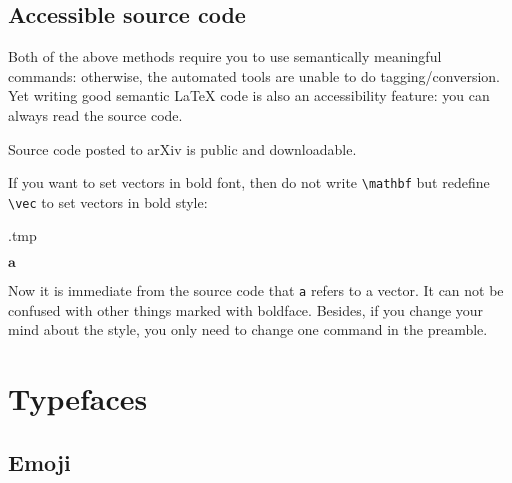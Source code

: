 %
%
\subsection{Accessible source code}

Both of the above methods require you to use semantically meaningful commands:
otherwise, the automated tools are unable to do tagging/conversion.
Yet writing good semantic \LaTeX{} code is also an accessibility feature:
you can always read the source code.

\begin{remark}
Source code posted to arXiv is public and downloadable.
\end{remark}

If you want to set vectors in bold font, then do not write \verb|\mathbf| but
redefine \verb|\vec| to set vectors in bold style:
%
\begin{VerbatimOut}{\jobname.tmp}
\renewcommand{\vec}{\mathbf}

$\vec a$
\end{VerbatimOut}
\ShowExample
%
Now it is immediate from the source code that \verb|a| refers to a vector.
It can not be confused with other things marked with boldface.
Besides, if you change your mind about the style,
you only need to change one command in the preamble.


%
%
%
\section{Typefaces}\label{sec:typefaces}



\subsection{Emoji}\label{sec:emoji}

